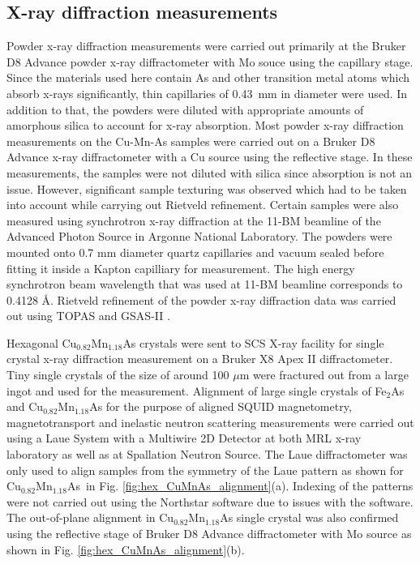 \documentclass[10pt,doublespacing,edeposit]{uiucthesis2020}
\newcommand*{\cumnas}{Cu$_{0.82}$Mn$_{1.18}$As}
\begin{document}
\begin{mainmatter}
\subsection{X-ray diffraction measurements}


Powder x-ray diffraction measurements were carried out primarily at the Bruker D8 Advance powder x-ray diffractometer with Mo souce using the capillary stage. Since the materials used here contain As and other transition metal atoms which absorb x-rays significantly, thin capillaries of 0.43~mm in diameter were used. In addition to that, the powders were diluted with appropriate amounts of amorphous silica to account for x-ray absorption. Most powder x-ray diffraction measurements on the Cu-Mn-As samples were carried out on a Bruker D8 Advance x-ray diffractometer with a Cu source using the reflective stage. In these measurements, the samples were not diluted with silica since absorption is not an issue. However, significant sample texturing was observed which had to be taken into account while carrying out Rietveld refinement. Certain samples were also measured using synchrotron x-ray diffraction at the 11-BM beamline of the Advanced Photon Source in Argonne National Laboratory. The powders were mounted onto 0.7 mm diameter quartz capillaries and vacuum sealed before fitting it inside a Kapton capilliary for measurement. The high energy synchrotron beam wavelength that was used at 11-BM beamline corresponds to 0.4128 \AA. Rietveld refinement of the powder x-ray diffraction data was carried out using \textsc{TOPAS} and \textsc{GSAS-II} \cite{Coelho:jo5037,Toby:aj5212}.

Hexagonal Cu$_{0.82}$Mn$_{1.18}$As crystals were sent to SCS X-ray facility for single crystal x-ray diffraction measurement on a Bruker X8 Apex II diffractometer. Tiny single crystals of the size of around 100 $\mu$m were fractured out from a large ingot and used for the measurement. Alignment of large single crystals of Fe$_2$As and Cu$_{0.82}$Mn$_{1.18}$As for the purpose of aligned SQUID magnetometry, magnetotransport and inelastic neutron scattering measurements were carried out using a Laue System with a Multiwire 2D Detector at both MRL x-ray laboratory as well as at Spallation Neutron Source. The Laue diffractometer was only used to align samples from the symmetry of the Laue pattern as shown for \cumnas\ in Fig. \ref{fig:hex_CuMnAs_alignment}(a). Indexing of the patterns were not carried out using the Northstar software due to issues with the software. The out-of-plane alignment in Cu$_{0.82}$Mn$_{1.18}$As single crystal was also confirmed using the reflective stage of Bruker D8 Advance diffractometer with Mo source as shown in Fig. \ref{fig:hex_CuMnAs_alignment}(b).


\end{mainmatter}
\end{document}
